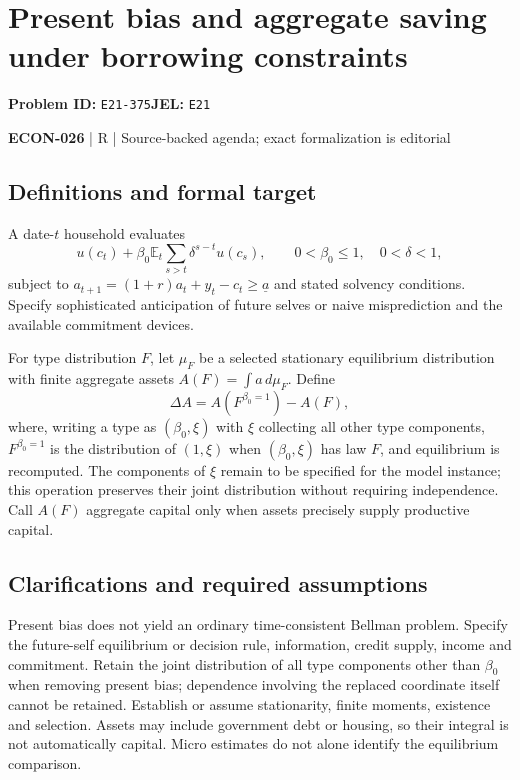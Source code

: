\documentclass[11pt,a4paper]{article}
\begin{document}
\section*{Present bias and aggregate saving under borrowing constraints}
\textbf{Problem ID:} \texttt{E21-375}\quad \textbf{JEL:} \texttt{E21}\par
\label{problem:OP-0607}


\label{audited:ECON-026}

{\sffamily\small\color{muted}\textbf{ECON-026} | R | Source-backed agenda; exact formalization is editorial\par}

\subsection*{Definitions and formal target}

A date-\(t\) household evaluates
\[
 u(c_t)+\beta_0\mathbb E_t\sum_{s>t}\delta^{s-t}u(c_s),
 \qquad 0<\beta_0\leq1,\quad0<\delta<1,
\]
subject to \(a_{t+1}=(1+r)a_t+y_t-c_t\geq\underline a\) and stated solvency conditions. Specify sophisticated anticipation of future selves or naive misprediction and the available commitment devices.

For type distribution \(F\), let \(\mu_F\) be a selected stationary equilibrium distribution with finite aggregate assets \(A(F)=\int a\,d\mu_F\). Define
\[
 \Delta A=A(F^{\beta_0=1})-A(F),
\]
where, writing a type as \((\beta_0,\xi)\) with \(\xi\) collecting all other type components, \(F^{\beta_0=1}\) is the distribution of \((1,\xi)\) when \((\beta_0,\xi)\) has law \(F\), and equilibrium is recomputed. The components of \(\xi\) remain to be specified for the model instance; this operation preserves their joint distribution without requiring independence. Call \(A(F)\) aggregate capital only when assets precisely supply productive capital.

\subsection*{Clarifications and required assumptions}

Present bias does not yield an ordinary time-consistent Bellman problem. Specify the future-self equilibrium or decision rule, information, credit supply, income and commitment. Retain the joint distribution of all type components other than \(\beta_0\) when removing present bias; dependence involving the replaced coordinate itself cannot be retained. Establish or assume stationarity, finite moments, existence and selection. Assets may include government debt or housing, so their integral is not automatically capital. Micro estimates do not alone identify the equilibrium comparison.
\end{document}

